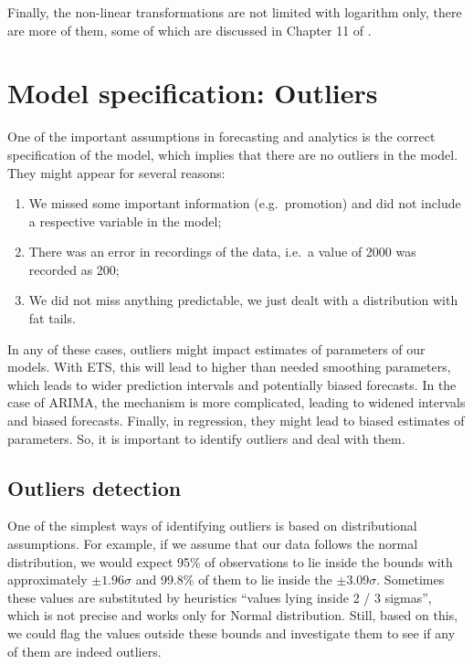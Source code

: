 \documentclass[
]{book}
\providecommand{\tightlist}{%
  \setlength{\itemsep}{0pt}\setlength{\parskip}{0pt}}
\theoremstyle{definition}
\theoremstyle{definition}
\theoremstyle{definition}
\theoremstyle{definition}
\theoremstyle{remark}
\begin{document}
Finally, the non-linear transformations are not limited with logarithm only, there are more of them, some of which are discussed in Chapter 11 of \citet{SvetunkovSBA}.

\hypertarget{diagnosticsOutliers}{%
\section{Model specification: Outliers}\label{diagnosticsOutliers}}

One of the important assumptions in forecasting and analytics is the correct specification of the model, which implies that there are no outliers in the model. They might appear for several reasons:

\begin{enumerate}
\def\labelenumi{\arabic{enumi}.}
\tightlist
\item
  We missed some important information (e.g.~promotion) and did not include a respective variable in the model;
\item
  There was an error in recordings of the data, i.e.~a value of 2000 was recorded as 200;
\item
  We did not miss anything predictable, we just dealt with a distribution with fat tails.
\end{enumerate}

In any of these cases, outliers might impact estimates of parameters of our models. With ETS, this will lead to higher than needed smoothing parameters, which leads to wider prediction intervals and potentially biased forecasts. In the case of ARIMA, the mechanism is more complicated, leading to widened intervals and biased forecasts. Finally, in regression, they might lead to biased estimates of parameters. So, it is important to identify outliers and deal with them.

\hypertarget{outliers-detection}{%
\subsection{Outliers detection}\label{outliers-detection}}

One of the simplest ways of identifying outliers is based on distributional assumptions. For example, if we assume that our data follows the normal distribution, we would expect 95\% of observations to lie inside the bounds with approximately \(\pm 1.96\sigma\) and 99.8\% of them to lie inside the \(\pm 3.09 \sigma\). Sometimes these values are substituted by heuristics ``values lying inside 2 / 3 sigmas'', which is not precise and works only for Normal distribution. Still, based on this, we could flag the values outside these bounds and investigate them to see if any of them are indeed outliers.
\end{document}
